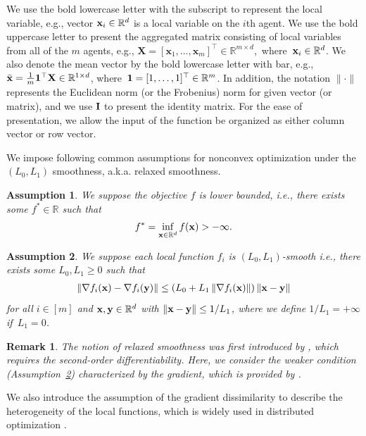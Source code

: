 \documentclass[sigconf]{acmart}
\newcommand{\Norm}[1]{\left\| #1 \right\|}
\def\vone{{\bf{1}}}
\def\vx{{\bf{x}}}
\def\vy{{\bf{y}}}
\def\BR{{\mathbb{R}}}
\def\mI {{\bf I}}
\def\mX {{\bf X}}
\theoremstyle{plain}
\newtheorem{asm}{Assumption}
\newtheorem{remark}{Remark}
\begin{document}
We use the bold lowercase letter with the subscript to represent the local variable, e.g., vector $\vx_i\in \mathbb{R}^{d}$ is a local variable on the $i$th agent. 
We use the bold uppercase letter to present the aggregated matrix consisting of local variables from all of the $m$ agents, e.g., 
\mbox{$\mathbf{X} = [\mathbf{x}_1, \dots, \mathbf{x}_m ]^\top\in\mathbb{R}^{m \times d}$, where $\vx_i\in \mathbb{R}^{d}$}.
We also denote the mean vector by the bold lowercase letter with bar,  e.g., $\bar{\vx} = \frac{1}{m} \vone^\top\mX\in\BR^{1\times d}$, 
where~$\vone=[1,\dots,1]^\top\in\BR^{m}$.
In addition, the notation $\| \cdot \|$ represents the Euclidean norm (or the Frobenius) norm for given vector (or matrix),
and we use $\mI$ to present the identity matrix.
For the ease of presentation, we allow the input of the function be organized as either column vector or row vector.

We impose following common assumptions for nonconvex optimization under the $(L_0, L_1)$ smoothness, a.k.a. relaxed smoothness.

\begin{asm}\label{asm:lower}
    We suppose the objective $f$ is lower bounded, i.e., there exists some $f^*\in\BR$ such that
    \begin{align*}
    f^* = \inf_{\vx\in\BR^d} f(\vx) > -\infty.
    \end{align*}
\end{asm}


\begin{asm}\label{asm:sym-1}
    We suppose each local function $f_i$ is $(L_0,L_1)$-smooth i.e., there exists some $L_0,L_1\geq0$ such that  
    \begin{align}\label{eq:asm:sym-1}
    \Norm{\nabla f_i(\vx)-\nabla f_i(\vy)} \leq \left(L_0 + L_1 \Norm{\nabla f_i(\vx)}\right)\Norm{\vx-\vy}    
    \end{align}
    for all $i\in[m]$ and $\vx,\vy\in\BR^d$ with $\Norm{\vx-\vy}\leq 1/L_1$, where we define $1/L_1=+\infty$ if~$L_1=0$.
\end{asm}

\begin{remark}
The notion of relaxed smoothness was first introduced by \citet{zhang2020gradient}, which requires the second-order differentiability. 
Here, we consider the weaker condition (Assumption~\ref{asm:sym-1}) characterized by the gradient, which is provided by \citet{zhang2020improved}.
\end{remark}

We also introduce the assumption of the gradient dissimilarity to describe the heterogeneity of the local functions, which is widely used in distributed optimization \citep{woodworth2020minibatch,gorbunov2021local,assran2019stochastic,lian2017can}. 
\end{document}
